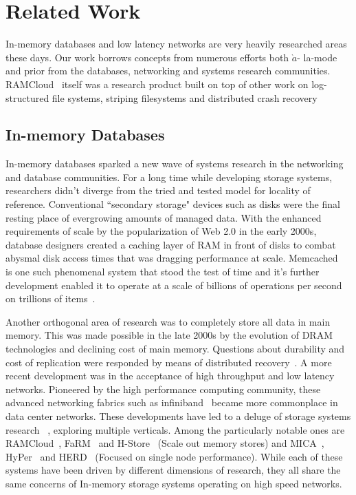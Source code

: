 
\chapter{Related Work}
In-memory databases and low latency networks are very heavily researched areas
these days. Our work borrows concepts from numerous efforts both $\grave{a}$-
la-mode and prior from the databases, networking and systems research communities.
RAMCloud~\cite{ramcloud} itself was a research product built on top of other 
work on log-structured file systems, striping filesystems and distributed 
crash recovery~\cite{ryan-thesis,ongaro2011fast}

\section{In-memory Databases}
In-memory databases sparked a new wave of systems research in the 
networking and database communities. For a long time while developing storage
systems, researchers didn't diverge from the  tried and tested model for
locality of reference. Conventional ``secondary storage" devices
such as disks were the final resting place of evergrowing amounts of managed data. With the 
enhanced requirements of scale by the popularization of Web 2.0 in the early 2000s, 
database designers created a caching layer of RAM in front of disks
to combat abysmal disk access times that was dragging performance at scale. Memcached~\cite{memcached-orig}
is one such phenomenal system that stood the test of time and it's further development
enabled it to operate at a scale of billions of operations per second on trillions of items~\cite{nishtala2013scaling}.

Another orthogonal area of research was to completely store all data in main memory.
This was made possible in the late 2000s by the evolution of DRAM technologies and declining cost of main memory.
Questions about durability and cost of replication 
were responded by means of distributed recovery~\cite{ongaro2011fast}. 
A more recent development was in the acceptance of high throughput and low latency networks. 
Pioneered by the high performance computing community, these advanced networking fabrics 
such as infiniband~\cite{pfister2001introduction} became more commonplace in 
data center networks. These developments have led to a deluge of storage systems research~\cite{mmdbmstutorial} ,
exploring multiple verticals. Among the particularly notable ones are RAMCloud~\cite{ramcloud},
FaRM~\cite{farm} and H-Store~\cite{hstore} (Scale out memory stores) and
MICA~\cite{mica}, HyPer~\cite{hyper} and HERD~\cite{herd} (Focused on single node performance).
While each of these systems have been driven by different dimensions 
of research, they all share the same concerns of In-memory storage systems 
operating on high speed networks.

